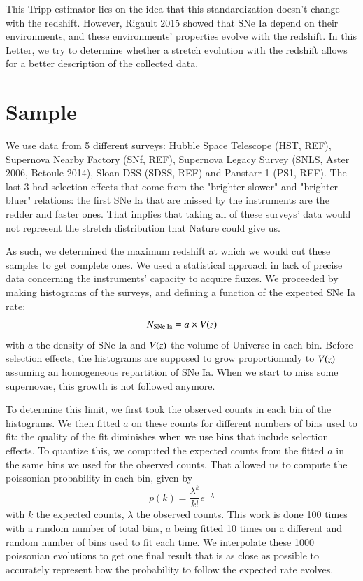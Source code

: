 \documentclass{aa}
\def\l{\lambda}\def\L{\Lambda}
\begin{document}
This Tripp estimator lies on the idea that this standardization doesn't change
with the redshift. However, Rigault 2015 showed that SNe Ia depend on their
environments, and these environments' properties evolve with the redshift. In
this Letter, we try to determine whether a stretch evolution with the redshift
allows for a better description of the collected data.

\section{Sample}\label{sec:sam}

We use data from 5 different surveys: Hubble Space Telescope (HST, REF),
Supernova Nearby Factory (SNf, REF), Supernova Legacy Survey (SNLS, Aster 2006,
Betoule 2014), Sloan DSS (SDSS, REF) and Panstarr-1 (PS1, REF). The last 3 had
selection effects that come from the "brighter-slower" and "brighter-bluer"
relations: the first SNe Ia that are missed by the instruments are the redder
and faster ones. That implies that taking all of these surveys' data would not
represent the stretch distribution that Nature could give us.

As such, we determined the maximum redshift at which we would cut these samples
to get complete ones. We used a statistical approach in lack of precise data
concerning the instruments' capacity to acquire fluxes. We proceeded by making
histograms of the surveys, and defining a function of the expected SNe Ia rate:
\begin{equation}
    N_{\text{SNe Ia}} = a \times V(z)
\end{equation}
with $a$ the density of SNe Ia and $V(z)$ the volume of Universe in each bin.
Before selection effects, the histograms are supposed to grow proportionnaly to
$V(z)$ assuming an homogeneous repartition of SNe Ia. When we start to miss some
supernovae, this growth is not followed anymore.

To determine this limit, we first took the observed counts in each bin of the
histograms. We then fitted $a$ on these counts for different numbers of bins
used to fit: the quality of the fit diminishes when we use bins that include
selection effects. To quantize this, we computed the expected counts from the
fitted $a$ in the same bins we used for the observed counts. That allowed us to
compute the poissonian probability in each bin, given by
\begin{equation}
    p(k) = \frac{\l^k}{k!}e^{-\l}
\end{equation}
with $k$ the expected counts, $\l$ the observed counts. This work is done 100
times with a random number of total bins, $a$ being fitted 10 times on a
different and random number of bins used to fit each time. We interpolate these
1000 poissonian evolutions to get one final result that is as close as possible
to accurately represent how the probability to follow the expected rate evolves.
\end{document}
